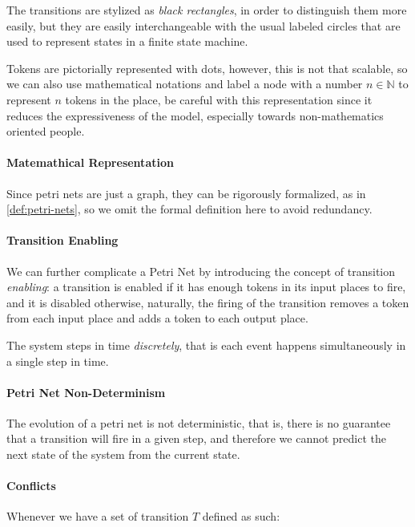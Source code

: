 \documentclass[openright, twoside, twocolumn]{report}
\begin{document}
    The transitions are stylized as \emph{black rectangles}, in order to distinguish them more easily, but they are easily interchangeable 
    with the usual labeled circles that are used to represent states in a finite state machine.

    Tokens are pictorially represented with dots, however, this is not that scalable, so we can also use mathematical 
    notations and label a node with a number $n \in \mathbb{N}$ to represent $n$ tokens in the place, be careful with 
    this representation since it reduces the expressiveness of the model, especially towards non-mathematics oriented 
    people.


    \paragraph{Matemathical Representation}
    Since petri nets are just a graph, they can be rigorously formalized, as in \cref{def:petri-nets}, so we omit 
    the formal definition here to avoid redundancy. 

    \paragraph{Transition Enabling} 
    
    We can further complicate a Petri Net by introducing the concept of transition \emph{enabling}: a transition 
    is enabled if it has enough tokens in its input places to fire, and it is disabled otherwise, naturally, 
    the firing of the transition removes a token from each input place and adds a token to each output place.

    The system steps in time \emph{discretely}, that is each event happens simultaneously in a single step in 
    time.

    \paragraph{Petri Net Non-Determinism}
    
    The evolution of a petri net is not deterministic, that is, there is no guarantee that a transition will fire
    in a given step, and therefore we cannot predict the next state of the system from the current state.
    
    \paragraph{Conflicts} 
    Whenever we have a set of transition $T$ defined as such:
\end{document}
